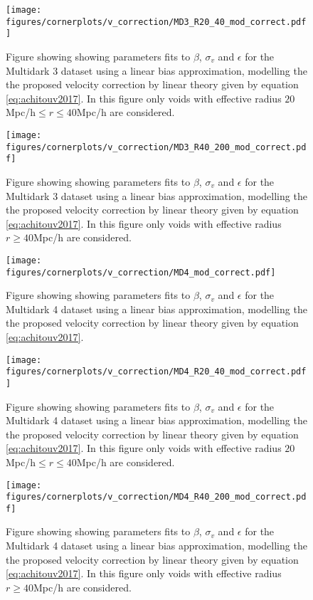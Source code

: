 \begin{figure}[H]
    \texttt{[image: figures/cornerplots/v\_correction/MD3\_R20\_40\_mod\_correct.pdf]}
    \caption{Figure showing showing parameters fits to $\beta$, $\sigma_v$ and $\epsilon$ for the Multidark 3 dataset using a linear bias approximation, modelling the the proposed velocity correction by \cite{Achitouv_streaming} linear theory given by equation \ref{eq:achitouv2017}. In this figure only voids with effective radius $20$Mpc/h$\leq r \leq 40$Mpc/h are considered.}
    \label{fig:linbiasMD3modR2040}
\end{figure}

\begin{figure}[H]
    \texttt{[image: figures/cornerplots/v\_correction/MD3\_R40\_200\_mod\_correct.pdf]}
    \caption{Figure showing showing parameters fits to $\beta$, $\sigma_v$ and $\epsilon$ for the Multidark 3 dataset using a linear bias approximation, modelling the the proposed velocity correction by \cite{Achitouv_streaming} linear theory given by equation \ref{eq:achitouv2017}. In this figure only voids with effective radius $r \geq 40$Mpc/h are considered.}
    \label{fig:linbiasMD3modR40}
\end{figure}


\begin{figure}[H]
    \texttt{[image: figures/cornerplots/v\_correction/MD4\_mod\_correct.pdf]}
    \caption{Figure showing showing parameters fits to $\beta$, $\sigma_v$ and $\epsilon$ for the Multidark 4 dataset using a linear bias approximation, modelling the the proposed velocity correction by \cite{Achitouv_streaming} linear theory given by equation \ref{eq:achitouv2017}.}
    \label{fig:linbiasMD4mod}
\end{figure}

\begin{figure}[H]
    \texttt{[image: figures/cornerplots/v\_correction/MD4\_R20\_40\_mod\_correct.pdf]}
    \caption{Figure showing showing parameters fits to $\beta$, $\sigma_v$ and $\epsilon$ for the Multidark 4 dataset using a linear bias approximation, modelling the the proposed velocity correction by \cite{Achitouv_streaming} linear theory given by equation \ref{eq:achitouv2017}. In this figure only voids with effective radius $20$Mpc/h$\leq r \leq 40$Mpc/h are considered.}
    \label{fig:linbiasMD4modR2040}
\end{figure}

\begin{figure}[H]
    \texttt{[image: figures/cornerplots/v\_correction/MD4\_R40\_200\_mod\_correct.pdf]}
    \caption{Figure showing showing parameters fits to $\beta$, $\sigma_v$ and $\epsilon$ for the Multidark 4 dataset using a linear bias approximation, modelling the the proposed velocity correction by \cite{Achitouv_streaming} linear theory given by equation \ref{eq:achitouv2017}. In this figure only voids with effective radius $r \geq 40$Mpc/h are considered.}
    \label{fig:linbiasMD4modR40}
\end{figure}

